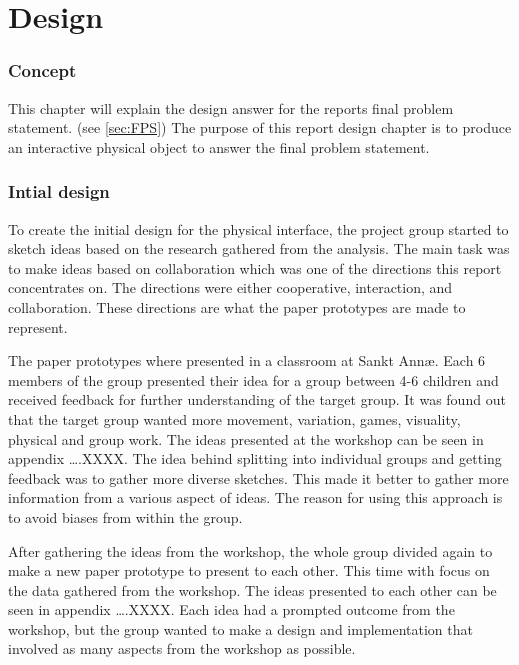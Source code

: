 \chapter{Design}

\subsection{Concept}
This chapter will explain the design answer for the reports final problem statement. (see \autoref{sec:FPS}) The purpose of this report design chapter is to produce an interactive physical object to answer the final problem statement. 

\subsection{Intial design}
\setlength{\parskip}{1em}

\setlength{\parindent}{10ex}
To create the initial design for the physical interface, the project group started to sketch ideas based on the research gathered from the analysis. The main task was to make ideas based on collaboration which was one of the directions this report concentrates on. The directions were either cooperative, interaction, and collaboration. These directions are what the paper prototypes are made to represent.\par

\setlength{\parindent}{10ex}
The paper prototypes where presented in a classroom at Sankt Annæ. Each 6 members of the group presented their idea for a group between 4-6 children and received feedback for further understanding of the target group. It was found out that the target group wanted more movement, variation, games, visuality, physical and group work. 
The ideas presented at the workshop can be seen in appendix ….XXXX.
The idea behind splitting into individual groups and getting feedback was to gather more diverse sketches. This made it better to gather more information from a various aspect of ideas. The reason for using this approach is to avoid biases from within the group. \par

\setlength{\parindent}{10ex}
After gathering the ideas from the workshop, the whole group divided again to make a new paper prototype to present to each other. This time with focus on the data gathered from the workshop. 
The ideas presented to each other can be seen in appendix ….XXXX. 
Each idea had a prompted outcome from the workshop, but the group wanted to make a design and implementation that involved as many aspects from the workshop as possible. \par

